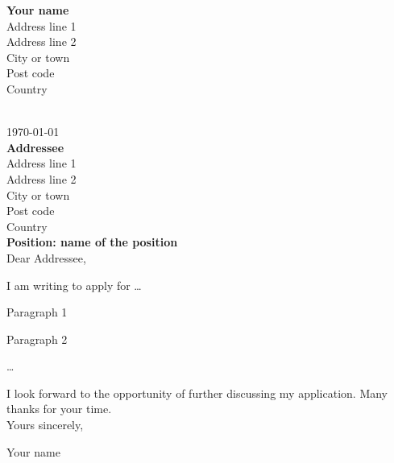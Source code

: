 \documentclass[12pt]{article}
\begin{document}
\bigskip

\begin{flushright}
    \textbf{Your name}\\
    Address line 1\\
    Address line 2\\
    City or town\\
    Post code\\
    Country
\end{flushright}
~\\[-40pt]

\today\\[-5pt]

\textbf{Addressee}\\
Address line 1\\
Address line 2\\
City or town\\
Post code\\
Country\\[-5pt]

\textbf{Position: name of the position}\\
	
Dear Addressee,

\noindent
I am writing to apply for \dots

\noindent
Paragraph 1

\noindent
Paragraph 2

\dots

I look forward to the opportunity of further discussing my application. 
Many thanks for your time.\\

Yours sincerely,\\[-0.65cm]

\vspace{2cm} %

Your name\\
\end{document}
